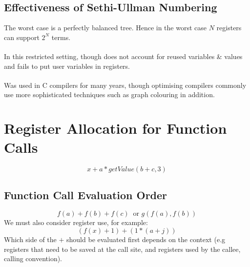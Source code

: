 \documentclass{report}
\begin{document}
\subsection*{Effectiveness of Sethi-Ullman Numbering}
The worst case is a perfectly balanced tree.
Hence in the worst case $N$ registers can support $2^N$ terms.
\\
\\ In this restricted setting, though does not account for reused variables \& values and fails to put user variables in registers.
\\
\\ Was used in C compilers for many years, though optimising compilers commonly use more sophisticated techniques such as graph colouring in addition.

\section*{Register Allocation for Function Calls}
\[x + a * getValue(b + c, 3)\]

\subsection*{Function Call Evaluation Order}
\[f(a) + f(b) + f(c) \ \text{ or } g(f(a),f(b))\]
We must also consider register use, for example:
\[(f(x) + 1) + (1 * (a + j))\]
Which side of the $+$ should be evaluated first depends on the context (e.g registers that need to be saved at the call site, and registers used by the callee, calling convention).
\end{document}
